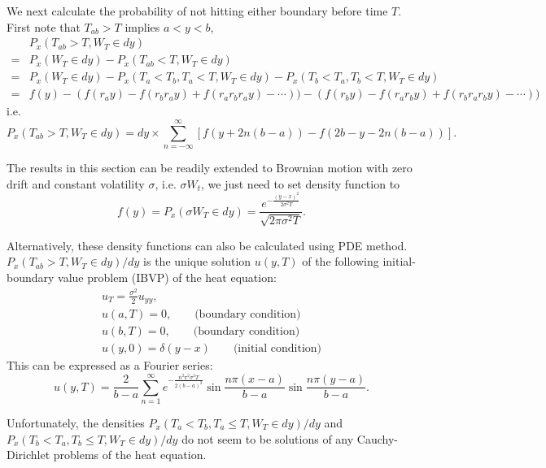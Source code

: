 We next calculate the probability of not hitting either boundary before time
$T$. First note that $T_{ab}>T$ implies $a<y<b$,
\begin{align*}
	& P_x(T_{ab}>T, W_T\in dy)  \\
	=& P_x(W_T\in dy) - P_x(T_{ab}<T,W_T\in dy)   \\
	=& P_x(W_T\in dy) - P_x(T_a<T_b, T_a<T, W_T\in dy)  
	   - P_x(T_b<T_a, T_b<T, W_T\in dy)    \\
  =& f(y) - ( f(r_a y) - f(r_b r_a y) + f(r_a r_b r_a y) - \cdots) )  
          - ( f(r_b y) - f(r_a r_b y) + f(r_b r_a r_b y) - \cdots) )  
\end{align*}
i.e.
\begin{equation}
	P_x(T_{ab}>T, W_T\in dy)  
	= dy\times\sum_{n=-\infty}^{\infty} [ f(y+2n(b-a)) - f(2b-y-2n(b-a)) ].
\end{equation}

The results in this section can be readily extended to Brownian motion with zero
drift and constant volatility $\sigma$, i.e. $\sigma W_t$, we just need to
set density function to
\[
	f(y) = P_x(\sigma W_T\in dy) 
	     = \frac{e^{-\frac{(y-x)^2}{2\sigma^2 T}}}{\sqrt{2\pi \sigma^2 T}}.
\]

Alternatively, these density functions can also be calculated using PDE method.
$P_x(T_{ab}>T, W_T\in dy)/dy$ is the unique solution $u(y,T)$ of the 
following initial-boundary value problem (IBVP) of the heat equation:
\begin{gather*}
	u_T = \frac{\sigma^2}{2} u_{yy},   \\
	u(a,T)=0,              \qquad \text{(boundary condition)}     \\
	u(b,T)=0,              \qquad \text{(boundary condition)}     \\
	u(y,0) = \delta(y-x) \qquad \text{(initial condition)}
\end{gather*}
This can be expressed as a Fourier series:
\begin{equation}
	u(y,T) = 
	  \frac{2}{b-a} 
		\sum_{n=1}^{\infty} e^{-\frac{n^2\pi^2 \sigma^2 T}{2(b-a)^2}}
			\sin \frac{n\pi (x-a)}{b-a} \sin \frac{n\pi (y-a)}{b-a}.
\end{equation}

Unfortunately, the densities $P_x(T_a<T_b, T_a\le T, W_T\in dy)/dy$ and
$P_x(T_b<T_a, T_b\le T, W_T\in dy)/dy$ do not seem to be solutions of any
Cauchy-Dirichlet problems of the heat equation.

